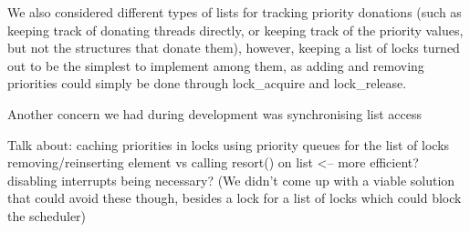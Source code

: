 We also considered different types of lists for tracking priority donations (such as keeping track of donating threads directly, or keeping track of the priority values, but not the structures that donate them), however, keeping a list of locks turned out to be the simplest to implement among them, as adding and removing priorities could simply be done through lock_acquire and lock_release.

Another concern we had during development was synchronising list access 

Talk about:
	caching priorities in locks
	using priority queues for the list of locks
  removing/reinserting element vs calling resort() on list <-- more efficient?
	disabling interrupts being necessary? (We didn't come up with a viable solution that could avoid these though, besides a lock for a list of locks which could block the scheduler)
